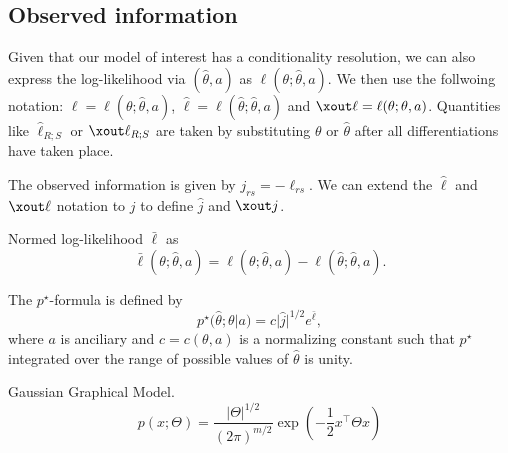 \subsection{Observed information}

Given that our model of interest has a conditionality resolution, we can also express the log-likelihood via $(\hat\theta, a)$ as $\ell(\theta; \hat\theta, a)$. We then use the follwoing notation: $\ell = \ell(\theta; \hat\theta, a)$, $\hat\ell = \ell(\hat\theta; \hat\theta, a)$ and $\xout\ell = \ell(\theta; \theta, a)$. Quantities like $\hat\ell_{R;S}$ or $\xout\ell_{R;S}$ are taken by substituting $\theta$ or $\hat\theta$ after all differentiations have taken place.

The observed information is given by $j_{rs} = -\ell_{rs}$. We can extend the $\hat\ell$ and $\xout\ell$ notation to $j$ to define $\hat j$ and $\xout j$.


\begin{definition}
    Normed log-likelihood $\bar\ell$ as 
    \begin{equation*}
        \bar\ell(\theta; \hat\theta, a) = \ell(\theta; \hat\theta, a) - \ell(\hat\theta; \hat\theta, a).
    \end{equation*}
        
\end{definition}


\begin{definition}
    The $p^\star$-formula is defined by
    \begin{equation}\label{def-pstar}
        p^\star(\hat\theta; \theta | a) = c |\hat j|^{1/2}e^{\bar \ell},
    \end{equation}
    where $a$ is anciliary and $c = c(\theta, a)$ is a normalizing constant such that $p^\star$ integrated over the range of possible values of $\hat\theta$ is unity.
\end{definition}




\begin{definition}
    Gaussian Graphical Model.
    \begin{equation*}
        p(x; \Theta) = \frac{|\Theta|^{1/2}}{(2\pi)^{m/2}} \exp\left( -\frac12x^\top\Theta x \right)
    \end{equation*}
\end{definition}